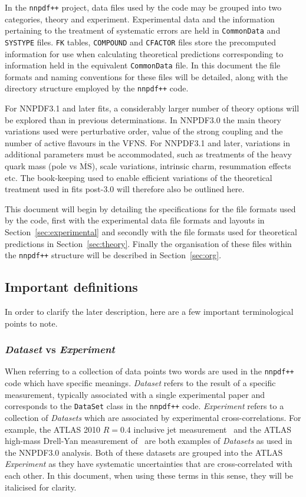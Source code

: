 \documentclass[11pt]{article}
\begin{document}
In the {\tt nnpdf++} project, data files used by the code may be grouped into two categories, theory and experiment. Experimental data and the information pertaining to the treatment of systematic errors are held in {\tt CommonData} and {\tt SYSTYPE} files. {\tt FK} tables, {\tt COMPOUND} and {\tt CFACTOR} files store the precomputed information for use when calculating theoretical predictions corresponding to information held in the equivalent {\tt CommonData} file. In this document the file formats and naming conventions for these files will be detailed, along with the directory structure employed by the {\tt nnpdf++} code.

For NNPDF3.1 and later fits, a considerably larger number of theory options will be explored than in previous determinations. In NNPDF3.0 the main theory variations used were perturbative order, value of the strong coupling and the number of active flavours in the VFNS. For NNPDF3.1 and later, variations in additional parameters must be accommodated, such as treatments of the heavy quark mass (pole vs $\overline{\mathrm{MS}}$), scale variations,  intrinsic charm, resummation effects etc. The book-keeping used to enable efficient variations of the theoretical treatment used in fits post-3.0 will therefore also be outlined here.

This document will begin by detailing the specifications for the file formats used by the code, first with the experimental data file formats and layouts in Section~\ref{sec:experimental} and secondly with the file formats used for theoretical predictions in Section~\ref{sec:theory}. Finally the organisation of these files within the {\tt nnpdf++} structure will be described in Section~\ref{sec:org}.

\subsection{Important definitions}
In order to clarify the later description, here are a few important terminological points to note.

\subsubsection*{\emph{Dataset} vs \emph{Experiment}}
When referring to a collection of data points two words are used in the {\tt nnpdf++} code which have specific meanings.
\emph{Dataset} refers to the result of a specific measurement, typically associated with a single experimental paper and corresponds to the {\tt DataSet} class in the {\tt nnpdf++} code. \emph{Experiment} refers
to a collection of \emph{Datasets} which are associated by experimental cross-correlations. For example, the ATLAS 2010 $R=0.4$ inclusive jet measurement~\cite{Aad:2011fc}
and the ATLAS high-mass Drell-Yan measurement of~\cite{Aad:2013iua} are both examples of \emph{Datasets} as used in the NNPDF3.0 analysis. Both of these datasets are
grouped into the ATLAS \emph{Experiment} as they have systematic uncertainties that are cross-correlated with each other. In this document, when using these terms in
this sense, they will be italicised for clarity.
\end{document}
